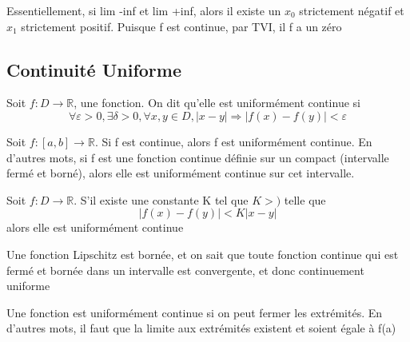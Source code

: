 \documentclass{article}
\begin{document}
\begin{problème}[Montrer que si f est continue est $\lim_{n \to -\infty}
    a_n = -\infty$ et $\lim_{n \to \infty} \infty$, alors f possède au
    moins un zéro]
    Essentiellement, si lim -inf et lim +inf, alors il existe un $x_0$
    strictement négatif et $x_1$ strictement positif. Puisque f est
    continue, par TVI, il f a un zéro
\end{problème}

\subsection{Continuité Uniforme}

\begin{definition}
    Soit $f:D \to \mathbb{R}$, une fonction. On dit qu'elle est
    uniformément continue si $$\forall \varepsilon > 0, \exists \delta >0,
    \forall x,y \in D, |x-y| \Longrightarrow |f(x) - f(y)|< \varepsilon$$
\end{definition}

\begin{theorem}
    Soit $f:[a,b] \to \mathbb{R}$. Si f est continue, alors f est
    uniformément continue. En d'autres mots, si f est une fonction
    continue définie sur un compact (intervalle fermé et borné), alors
    elle est uniformément continue sur cet intervalle.
\end{theorem}

\begin{theorem}
    Soit $f:D \to \mathbb{R}$. S'il existe une constante K tel que
    $K >)$ telle que $$ |f(x) - f(y)| < K |x-y|$$ alors elle est
    uniformément continue
\end{theorem}

\begin{remark}
    Une fonction Lipschitz est bornée, et on sait que toute fonction
    continue qui est fermé et bornée dans un intervalle est convergente,
    et donc continuement uniforme
\end{remark}

\begin{problem}
    Une fonction est uniformément continue si on peut fermer les extrémités. En
    d'autres mots, il faut que la limite aux extrémités existent et soient
    égale à f(a)
\end{problem}

\pagebreak
\end{document}
